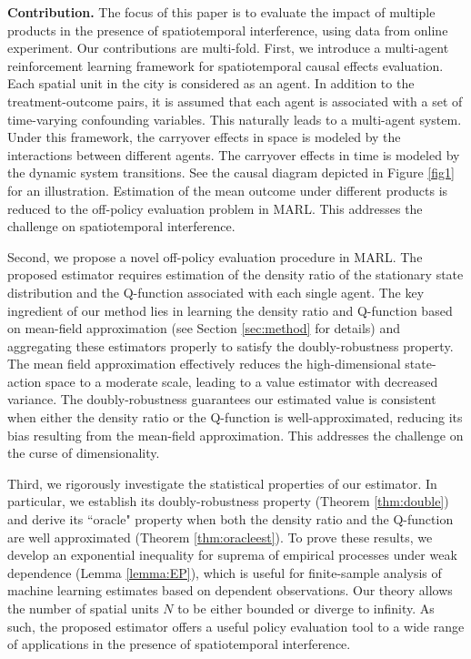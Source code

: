 \documentclass{article}
\begin{document}
\textbf{Contribution.} The focus of this paper is to evaluate the impact of multiple products in the presence of spatiotemporal interference, using data from online experiment. %
Our contributions are multi-fold. First, we introduce a multi-agent reinforcement learning \citep[MARL, see e.g.,][]{nowe2012game} framework for spatiotemporal causal effects evaluation. Each spatial unit in the city is considered as an agent. In addition to the treatment-outcome pairs, it is assumed that each agent is associated with a set of time-varying confounding variables. This naturally leads to a multi-agent system. Under this framework, the carryover effects in space is modeled by the interactions between different agents. The carryover effects in time is modeled by the dynamic system transitions. See the causal diagram depicted in Figure \ref{fig1} for an illustration. Estimation of the mean outcome under different products is reduced to the off-policy evaluation problem in MARL. This addresses the challenge on spatiotemporal interference. 

Second, we propose a novel off-policy evaluation procedure in MARL. The proposed estimator requires estimation of the density ratio of the stationary state distribution and the Q-function associated with each single agent. The key ingredient of our method lies in learning the density ratio and Q-function based on mean-field approximation (see Section \ref{sec:method} for details) and aggregating these estimators properly to satisfy the doubly-robustness property. The mean field approximation effectively reduces the high-dimensional state-action space to a moderate scale, leading to a value estimator with decreased variance. The doubly-robustness guarantees our estimated value is consistent when either the density ratio or the Q-function is well-approximated, reducing its bias resulting from the mean-field approximation. This addresses the challenge on the curse of dimensionality. 

Third, we rigorously investigate the statistical properties of our estimator. %
In particular, we establish its doubly-robustness property (Theorem \ref{thm:double}) and derive its ``oracle" property when both the density ratio and the Q-function are well approximated (Theorem \ref{thm:oracleest}). To prove these results, we develop an exponential inequality for suprema of empirical processes under weak dependence (Lemma \ref{lemma:EP}), which is useful for finite-sample analysis of machine learning estimates based on dependent observations. Our theory allows the number of spatial units $N$ to be either bounded or diverge to infinity. As such, the proposed estimator offers a useful policy evaluation tool to a wide range of applications in the presence of spatiotemporal interference. 
\end{document}

